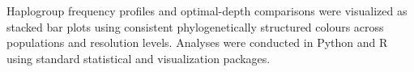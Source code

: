 \documentclass[12pt]{article}
\begin{document}
Haplogroup frequency profiles and optimal-depth comparisons were visualized as stacked bar plots using consistent phylogenetically structured colours across populations and resolution levels. Analyses were conducted in Python and R using standard statistical and visualization packages.


\printbibliography[title={References}]
\end{document}
